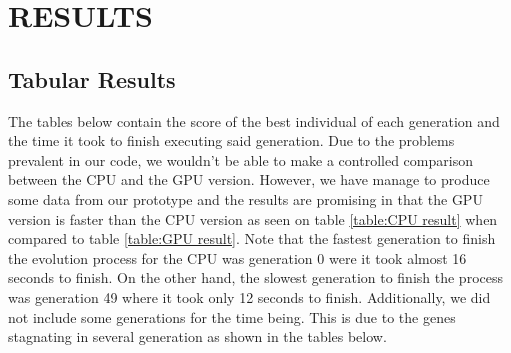 \chapter{RESULTS}
\section{Tabular Results} 
The tables below contain the score of the best individual of each generation and
the time it took to finish executing said generation. Due to the problems prevalent
in our code, we wouldn't be able to make a controlled comparison between the CPU
and the GPU version. However, we have manage to produce some data from our prototype
and the results are promising in that the GPU version is faster than the CPU version 
as seen on table \ref{table:CPU result} when compared to table \ref{table:GPU result}.
Note that the fastest generation to finish the evolution process for the CPU was generation
0 were it took almost 16 seconds to finish. On the other hand, the slowest generation
to finish the process was generation 49 where it took only 12 seconds to finish.
Additionally, we did not include some generations for the time being. This is due to
the genes stagnating in several generation as shown in the tables below.


